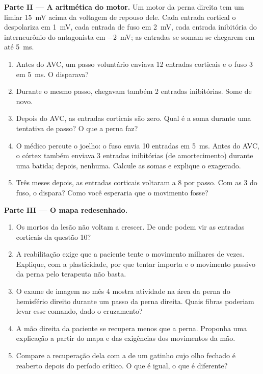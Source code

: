 \begin{problem}
\medskip
\noindent\textbf{Parte II --- A aritmética do  motor.}
Um  motor da perna direita tem um limiar \qty{15}{mV} acima da
voltagem de repouso dele. Cada entrada cortical o despolariza em
\qty{1}{mV}, cada entrada de fuso em \qty{2}{mV}, cada entrada
inibitória do interneurônio do antagonista em \qty{-2}{mV}; as entradas
se somam se chegarem em até \qty{5}{ms}.
\begin{enumerate}[resume]
  \item Antes do AVC, um passo voluntário enviava 12 entradas corticais
        e o fuso 3 em \qty{5}{ms}. O  disparava?
  \item Durante o mesmo passo, chegavam também 2 entradas inibitórias.
        Some de novo.
  \item Depois do AVC, as entradas corticais são zero. Qual é a soma
        durante uma tentativa de passo? O que a perna faz?
  \item O médico percute o joelho: o fuso envia 10 entradas em
        \qty{5}{ms}. Antes do AVC, o córtex também enviava 3 entradas
        inibitórias (de amortecimento) durante uma batida; depois,
        nenhuma. Calcule as somas e explique o  exagerado.
  \item Três meses depois, as entradas corticais voltaram a 8 por
        passo. Com as 3 do fuso, o  dispara? Como você
        esperaria que o movimento fosse?
\end{enumerate}

\medskip
\noindent\textbf{Parte III --- O mapa redesenhado.}
\begin{enumerate}[resume]
  \item Os  mortos da lesão não voltam a crescer. De onde
        podem vir as entradas corticais da questão 10?
  \item A reabilitação exige que a paciente tente o movimento milhares
        de vezes. Explique, com a plasticidade, por que tentar importa
        e o movimento passivo da perna pelo terapeuta não basta.
  \item O exame de imagem no mês 4 mostra atividade na área da perna do
        hemisfério direito durante um passo da perna direita. Quais
        fibras poderiam levar esse comando, dado o cruzamento?
  \item A mão direita da paciente se recupera menos que a perna.
        Proponha uma explicação a partir do mapa e das exigências dos
        movimentos da mão.
  \item Compare a recuperação dela com a de um gatinho cujo olho
        fechado é reaberto depois do período crítico. O que é igual, o
        que é diferente?
\end{enumerate}


\end{problem}
